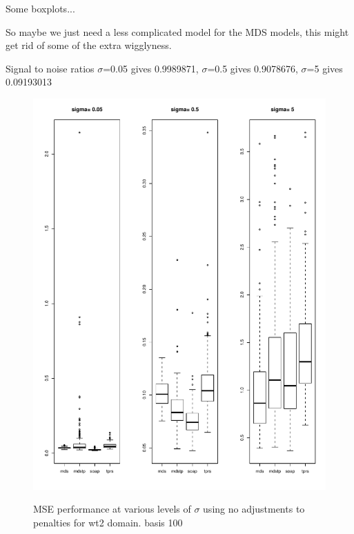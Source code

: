 \documentclass[a4paper,10pt]{article}
\begin{document}
Some boxplots...

So maybe we just need a less complicated model for the MDS models, this might get rid of some of the extra wigglyness.

Signal to noise ratios $\sigma$=0.05 gives 0.9989871, $\sigma$=0.5 gives 0.9078676, $\sigma$=5 gives 0.09193013 

\begin{figure}
\centering
\includegraphics[width=6in]{su-figs/wt2-mds-boxplots.pdf} \\
\caption{MSE performance at various levels of $\sigma$ using no adjustments to penalties for wt2 domain. basis 100}
\label{wt2-boxplots-old}
\end{figure}
\end{document}
